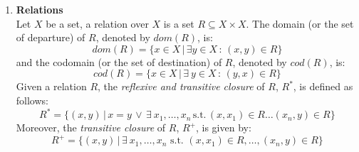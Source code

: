 \begin{enumerate}
\begin{itemize}
\begin{itemize}
        \noindent $C_2 \ominus C_1 = %
        (
        \{ r^1_1.(n_1,m^1_1), \ldots, r^1_{i_{n_{1}}}.(n_1,m^1_{i_{n_{1}}}),
        \ldots,
        r^l_1.(n_l,m^l_1), \ldots,(r^l_{j} - 1).(n_l,m^l_j),\\
        \ldots,
        r^l_{i_{n_{l}}}.(n_l,m^l_{i_{n_{l}}}), 
        \ldots, r^k_1.(n_k,m^k_1),\ldots, r^k_{i_{n_{k}}}.(n_k,m^k_{i_{n_{k}}}) \}
        ) 
        \ominus (C_1 - \{ 1.(n_l,m) \})
        $.

        Thus, $C_2 \ominus C_1$ is obtained by removing from $C_2$ 
        elements $(n,m)$ that correspond to elements $(n,m')$ of $C_1$,
        such that $m$ is the largest value with $m\leq m'$.

        \vspace*{0.12cm}

        For instance, taking $C_1 = \{
             1.(2,3), 1.(2,5), 1.(1,4), 1.(7,6)
        \}$, and $C_2 = $ \linebreak
        $\{
             1.(2,0), 1.(2,1), 1.(2,2), 1.(1,3), 2.(7,6), 3.(3,3)
        \}$ it follows that $C_1 \preceq C_2$. Then,
        $C_2 \ominus C_1= \{
            1.(2,0), 1.(7,6), 3.(3,3)
        \}$.
  \end{itemize} 
\end{itemize}

\item {\bf Relations}\\
Let $X$ be a set, a relation over $X$ is a set $R \subseteq X \times X$. 
The domain (or the set of departure) of $R$, denoted by $dom(R)$, is:
\[dom(R) = \{ x \in X \,|\, \exists
y \in X\,:\, (x,y) \in R \}\]
and the codomain (or the set of destination) of $R$, denoted by $cod(R)$, is:
\[cod(R) = \{ x \in X \,|\, \exists\ y \in X\,:\,(y,x) \in R\}\]
Given a relation $R$, the {\it reflexive and transitive closure} of $R$, $R^*$, is defined as follows:
\[ R^* = \{ (x,y)\,|\,x=y \,\vee\,
\exists\ x_1,\ldots,x_n\, \text{s.t.} \,(x,x_1)\in R\ldots(x_n,y) \in R\}\]
Moreover, the {\it transitive closure} of $R$, $R^+$, is given by:
\[R^+ = \{ (x,y)\,|\,
\exists \ x_1,\ldots,x_n \text{ s.t. } (x,x_1)\in R,\ldots,(x_n,y) \in R\}\]

\end{enumerate}


